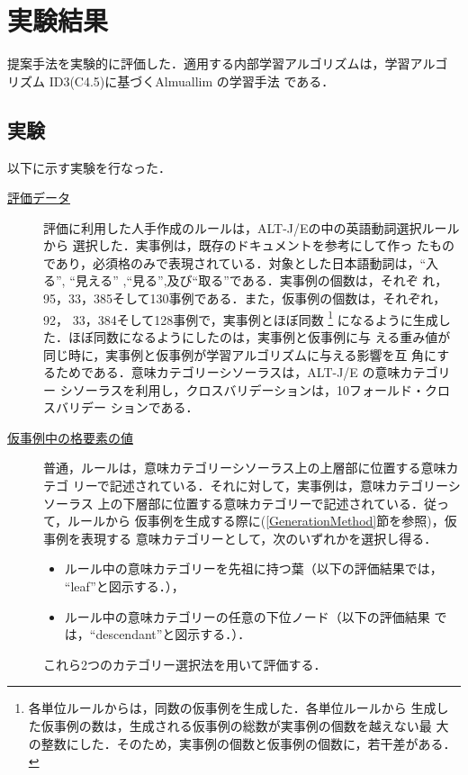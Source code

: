 \section{実験結果}
提案手法を実験的に評価した．適用する内部学習アルゴリズムは，学習アルゴ
リズム ID3(C4.5)\cite{Quinlan86,Quinlan92}に基づくAlmuallim の学習手法
\cite{Almuallim94c}である．

\subsection{実験}
以下に示す実験を行なった．
\begin{description}
\item[\underline{評価データ}]
評価に利用した人手作成のルールは，ALT-J/Eの中の英語動詞選択ルール から
選択した．実事例は，既存のドキュメント\cite{Horiguchi89}を参考にして作っ
たものであり，必須格のみで表現されている．対象とした日本語動詞は，``入
る'', ``見える'' ,``見る'',及び``取る''である．実事例の個数は，それぞ
れ，95，33，385そして130事例である．また，仮事例の個数は，それぞれ，92，
33，384そして128事例で，実事例とほぼ同数
\footnote{各単位ルールからは，同数の仮事例を生成した．各単位ルールから
生成した仮事例の数は，生成される仮事例の総数が実事例の個数を越えない最
大の整数にした．そのため，実事例の個数と仮事例の個数に，若干差がある．}
になるように生成した．ほぼ同数になるようにしたのは，実事例と仮事例に与
える重み値が同じ時に，実事例と仮事例が学習アルゴリズムに与える影響を互
角にするためである．意味カテゴリーシソーラスは，ALT-J/E の意味カテゴリー
シソーラスを利用し，クロスバリデーションは，10フォールド・クロスバリデー
ションである．

\item[\underline{仮事例中の格要素の値}]
普通，ルールは，意味カテゴリーシソーラス上の上層部に位置する意味カテゴ
リーで記述されている．それに対して，実事例は，意味カテゴリーシソーラス
上の下層部に位置する意味カテゴリーで記述されている．従って，ルールから
仮事例を生成する際に(\ref{GenerationMethod}節を参照)，仮事例を表現する
意味カテゴリーとして，次のいずれかを選択し得る．
\begin{itemize}
\item[(1)] ルール中の意味カテゴリーを先祖に持つ葉（以下の評価結果では，
``leaf''と図示する．），

\item[(2)] ルール中の意味カテゴリーの任意の下位ノード（以下の評価結果
では，``descendant''と図示する．）．

\end{itemize}
これら2つのカテゴリー選択法を用いて評価する．


\end{description}
